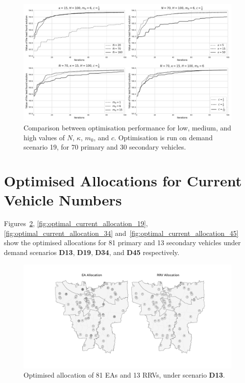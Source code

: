 \documentclass[preprint,12pt]{elsarticle}
\begin{document}
\begin{figure}[ht]
\centering
\includegraphics[width=\textwidth]{img/hyperparameter_exploration}
\caption{Comparison between optimisation performance for low, medium, and high
values of $N$, $\kappa$, $m_0$, and $c$. Optimisation is run on demand
scenario 19, for 70 primary and 30 secondary vehicles.}
\label{fig:hyperparameters_exploration}
\end{figure}


\section{Optimised Allocations for Current Vehicle Numbers}
Figures~\ref{fig:optimal_current_allocation_13},
\ref{fig:optimal_current_allocation_19}, \ref{fig:optimal_current_allocation_34}
and~\ref{fig:optimal_current_allocation_45} show the optimised allocations for
81 primary and 13 secondary vehicles under demand scenarios \textbf{D13},
\textbf{D19}, \textbf{D34}, and \textbf{D45} respectively.

\begin{figure}
\begin{center}
\includegraphics[width=\textwidth]{img/map_optimised_13}
\caption{Optimised allocation of 81 EAs and 13 RRVs, under scenario \textbf{D13}.}
\label{fig:optimal_current_allocation_13}
\end{center}
\end{figure}
\end{document}
